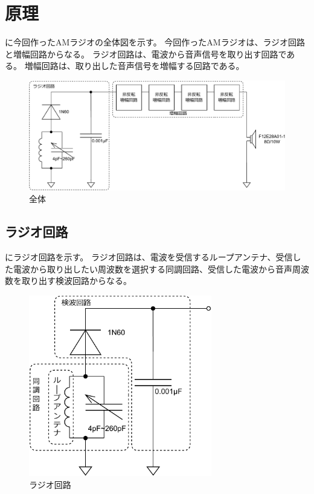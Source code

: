 \documentclass[report.tex]{subfiles}
\begin{document}
\section{原理}

に今回作ったAMラジオの全体図を示す。
今回作ったAMラジオは、ラジオ回路と増幅回路からなる。
ラジオ回路は、電波から音声信号を取り出す回路である。
増幅回路は、取り出した音声信号を増幅する回路である。

\begin{figure}[H]
	\centering
	\includegraphics[width=14cm]{fig/all2.pdf}
	\caption{全体}
	\label{fig:all2}
\end{figure}

\subsection{ラジオ回路}

にラジオ回路を示す。
ラジオ回路は、電波を受信するループアンテナ、受信した電波から取り出したい周波数を選択する同調回路、受信した電波から音声周波数を取り出す検波回路からなる。

\begin{figure}[H]
	\centering
	\includegraphics[width=8cm]{fig/radio.pdf}
	\caption{ラジオ回路}
	\label{fig:radio-circuit}
\end{figure}
\end{document}
